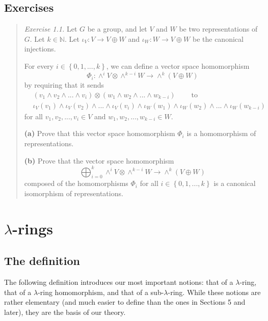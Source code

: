\documentclass[numbers=enddot,12pt,final,onecolumn,notitlepage]{scrartcl}%
\begin{document}
\subsection{Exercises}

\begin{quotation}
\textit{Exercise 1.1.} Let $G$ be a group, and let $V$ and $W$ be two
representations of $G$. Let $k\in\mathbb{N}$. Let $\iota_{V}:V\rightarrow
V\oplus W$ and $\iota_{W}:W\rightarrow V\oplus W$ be the canonical injections.

For every $i\in\left\{  0,1,...,k\right\}  $, we can define a vector space
homomorphism%
\[
\Phi_{i}:\wedge^{i}V\otimes\wedge^{k-i}W\rightarrow\wedge^{k}\left(  V\oplus
W\right)
\]
by requiring that it sends
\begin{align*}
&  \left(  v_{1}\wedge v_{2}\wedge...\wedge v_{i}\right)  \otimes\left(
w_{1}\wedge w_{2}\wedge...\wedge w_{k-i}\right)  \ \ \ \ \ \ \ \ \ \ \text{to}%
\\
&  \iota_{V}\left(  v_{1}\right)  \wedge\iota_{V}\left(  v_{2}\right)
\wedge...\wedge\iota_{V}\left(  v_{i}\right)  \wedge\iota_{W}\left(
w_{1}\right)  \wedge\iota_{W}\left(  w_{2}\right)  \wedge...\wedge\iota
_{W}\left(  w_{k-i}\right)
\end{align*}
for all $v_{1},v_{2},...,v_{i}\in V$ and $w_{1},w_{2},...,w_{k-i}\in W$.

\textbf{(a)} Prove that this vector space homomorphism $\Phi_{i}$ is a
homomorphism of representations.

\textbf{(b)} Prove that the vector space homomorphism%
\[
\bigoplus_{i=0}^{k}\wedge^{i}V\otimes\wedge^{k-i}W\rightarrow\wedge^{k}\left(
V\oplus W\right)
\]
composed of the homomorphisms $\Phi_{i}$ for all $i\in\left\{
0,1,...,k\right\}  $ is a canonical isomorphism of representations.
\end{quotation}

\section{$\lambda$-rings}

\subsection{The definition}

The following definition introduces our most important notions: that of a
$\lambda$-ring, that of a $\lambda$-ring homomorphism, and that of a
sub-$\lambda$-ring. While these notions are rather elementary (and much easier
to define than the ones in Sections 5 and later), they are the basis of our theory.
\end{document}
